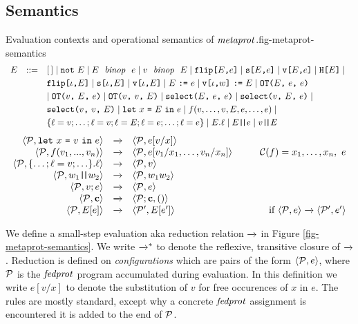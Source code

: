 \subsection{Semantics}

\begin{fpfig}[t]{Evaluation contexts and operational semantics of $\mathit{metaprot}$.}{fig-metaprot-semantics}
$$
\begin{array}{rcl@{\hspace{3mm}}r}
E &::=& [\,] \mid \enot\ E \mid E\ \bop\ e \mid v\ \bop\ E \mid  \flip{E}{e} \mid \secret{E}{e} \mid \view{E}{e} \mid \oracle{E} \mid  \\[1mm]
& & \flip{\cid}{E} \mid \secret{\cid}{E} \mid \view{\cid}{E} \mid \send{E}{e} \mid \send{\view{\cid}{w}}{E} \mid \OT{E}{e}{e} \\[1mm]
& & \mid \OT{v}{E}{e} \mid \OT{v}{v}{E} \mid \select{E}{e}{e} \mid \select{v}{E}{e} \mid \\[1mm]
& & \select{v}{v}{E} \mid \elet{x}{E}{e} \mid f(v,\ldots,v,E,e,\ldots,e) \mid \\[1mm]
& & \{ \flab = v;\ldots;\flab = v;\flab = E;\flab = e;\ldots;\flab = e \} \mid E.\flab \mid E\concat e \mid v \concat E
\end{array}
$$
\medskip
$$
\begin{array}{rcl@{\hspace{10mm}}r}
\config{\prog}{\elet{x}{v}{e}} &\redx& \config{\prog}{e[v/x]}\\
\config{\prog}{f(v_1,...,v_n)} &\redx&
\config{\prog}{e[v_1/x_1,\ldots,v_n/x_n]} & 
 \codebase(f) = x_1,\ldots,x_n,\ e\\
\config{\prog}{\{\ldots; \flab = v; \ldots\}.\flab} &\redx&
 \config{\prog}{v}\\
 \config{\prog}{w_1\concat w_2} &\redx& \config{\prog}{w_1w_2}\\
 \config{\prog}{v;e} &\redx& \config{\prog}{e}\\
\config{\prog}{\instr} &\redx& \config{\prog;\instr}{()}\\
\config{\prog}{E[e]} &\redx& \config{\prog'}{E[e']} & \text{if}\ \config{\prog}{e} \redx \config{\prog'}{e'} 
\end{array}
$$
\end{fpfig}

We define a small-step evaluation aka reduction relation $\xrightarrow{}$ in
Figure \ref{fig-metaprot-semantics}.  We write $\xrightarrow{}^{*}$ to denote the
reflexive, transitive closure of $\xrightarrow{}$. Reduction is defined on
\emph{configurations} which are pairs of the form $\langle \mathcal{P},e \rangle$,
where $\mathcal{P}$ is the $\mathit{fedprot}$ program accumulated during evaluation.
In this definition we write $e[v/x]$ to denote the substitution of $v$
for free occurences of $x$ in $e$. The rules are mostly standard,
except why a concrete $\mathit{fedprot}$ assignment is encountered it is added
to the end of $\mathcal{P}$.

